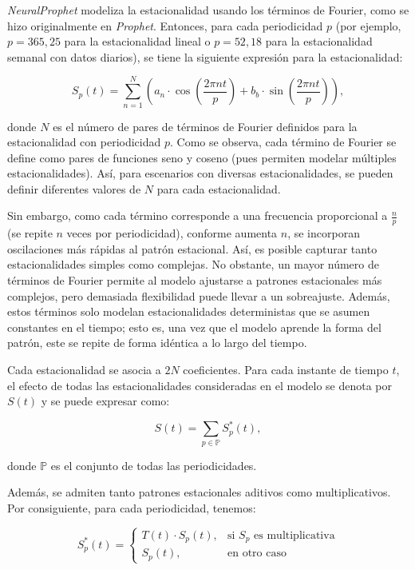 \documentclass[12pt,twoside]{article}
\begin{document}
\textit{NeuralProphet} modeliza la estacionalidad usando los términos de Fourier, como se hizo originalmente en \textit{Prophet}. Entonces, para cada periodicidad $p$ (por ejemplo, $p=365,25$ para la estacionalidad lineal o $p=52,18$ para la estacionalidad semanal con datos diarios), se tiene la siguiente expresión para la estacionalidad:

\begin{equation}
S_p(t) = \sum_{n=1}^{N} \left( a_n \cdot \cos\left( \frac{2\pi n t}{p} \right) + b_b \cdot \sin\left( \frac{2\pi n t}{p} \right) \right),
\end{equation}

donde $N$ es el número de pares de términos de Fourier definidos para la estacionalidad con periodicidad $p$. Como se observa, cada término de Fourier se define como pares de funciones seno y coseno (pues permiten modelar múltiples estacionalidades). Así, para escenarios con diversas estacionalidades, se pueden definir diferentes valores de $N$ para cada estacionalidad.

Sin embargo, como cada término corresponde a una frecuencia proporcional a $\frac{n}{p}$ (se repite $n$ veces por periodicidad), conforme aumenta $n$, se incorporan oscilaciones más rápidas al patrón estacional. Así, es posible capturar tanto estacionalidades simples como complejas. No obstante, un mayor número de términos de Fourier permite al modelo ajustarse a patrones estacionales más complejos, pero demasiada flexibilidad puede llevar a un sobreajuste. Además, estos términos solo modelan estacionalidades deterministas que se asumen constantes en el tiempo; esto es, una vez que el modelo aprende la forma del patrón, este se repite de forma idéntica a lo largo del tiempo.

Cada estacionalidad se asocia a $2N$ coeficientes. Para cada instante de tiempo $t$, el efecto de todas las estacionalidades consideradas en el modelo se denota por $S(t)$ y se puede expresar como:

\begin{equation}
S(t) = \sum_{p \in \mathbb{P}}S_p^*(t),
\end{equation}

donde $\mathbb{P}$ es el conjunto de todas las periodicidades.

Además, se admiten tanto patrones estacionales aditivos como multiplicativos. Por consiguiente, para cada periodicidad, tenemos:

\begin{equation}
S_p^*(t) = 
\begin{cases}
T(t) \cdot S_p(t), & \text{si } S_p \text{ es multiplicativa} \\
S_p(t), & \text{en otro caso}
\end{cases}
\end{equation}
\end{document}
